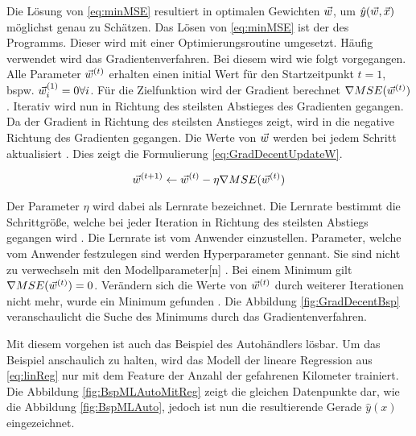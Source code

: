 Die Lösung von \ref{eq:minMSE} resultiert in optimalen Gewichten \(\vec{w}\), um \(\hat{y}(\vec{w}, \vec{x})\) möglichst genau zu Schätzen. Das Lösen von \ref{eq:minMSE} ist der  des Programms. Dieser wird mit einer Optimierungsroutine umgesetzt. Häufig verwendet wird das \gls{Gradientenverfahren}. Bei diesem wird wie folgt vorgegangen. Alle Parameter \(\vec{w}^{(t)}\) erhalten einen initial Wert für den Startzeitpunkt \(t=1\), bspw. \(\vec{w}_i^{(1)}=0 \forall i\). Für die \gls{Zielfunktion} wird der Gradient berechnet \(\nabla MSE(\vec{w}^{(t)})\). Iterativ wird nun in Richtung des steilsten Abstieges des Gradienten gegangen. Da der Gradient in Richtung des steilsten Anstieges zeigt, wird in die negative Richtung des Gradienten gegangen. Die Werte von \(\vec{w}\) werden bei jedem Schritt aktualisiert \cite{Mitchell.1997, Goodfellow.2016, ShalevShwartz.2014}. Dies zeigt die Formulierung \ref{eq:GradDecentUpdateW}.

\begin{equation}
    \label{eq:GradDecentUpdateW}
    \vec{w}^{(t+1)} \leftarrow \vec{w}^{(t)} - \eta\nabla MSE(\vec{w}^{(t)})
\end{equation}

Der Parameter \(\eta\) wird dabei als Lernrate bezeichnet. Die Lernrate bestimmt die Schrittgröße, welche bei jeder Iteration in Richtung des steilsten Abstiegs gegangen wird \cite{Mitchell.1997}. Die Lernrate ist vom Anwender einzustellen. Parameter, welche vom Anwender festzulegen sind werden \gls{Hyperparameter} gennant. Sie sind nicht zu verwechseln mit den \gls{Modellparameter}[n] \cite{Zheng.2015}. Bei einem Minimum gilt \(\nabla MSE(\vec{w}^{(t)}) = 0\). Verändern sich die Werte von \(\vec{w}^{(t)}\) durch weiterer Iterationen nicht mehr, wurde ein Minimum gefunden \cite{Goodfellow.2016, Burkov.2019}. Die Abbildung \ref{fig:GradDecentBsp} veranschaulicht die Suche des Minimums durch das \gls{Gradientenverfahren}.


Mit diesem vorgehen ist auch das Beispiel des Autohändlers lösbar. Um das Beispiel anschaulich zu halten, wird das Modell der lineare Regression aus \ref{eq:linReg} nur mit dem \gls{Feature} der Anzahl der gefahrenen Kilometer trainiert. Die Abbildung \ref{fig:BspMLAutoMitReg} zeigt die gleichen Datenpunkte dar, wie die Abbildung \ref{fig:BspMLAuto}, jedoch ist nun die resultierende Gerade \(\hat{y}(x)\) eingezeichnet. 


